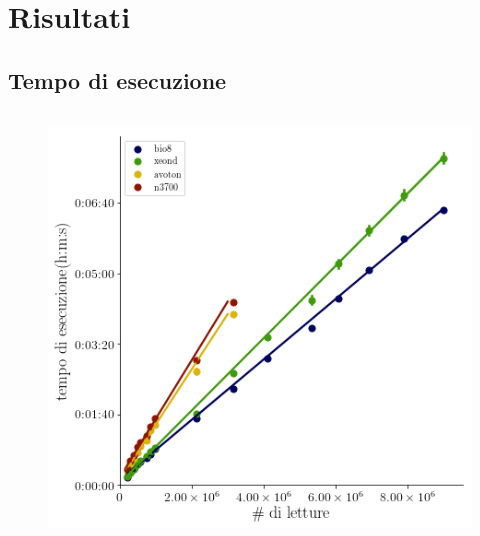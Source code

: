 \documentclass{beamer}
\begin{document}
\section{Risultati}
\subsection{Tempo di esecuzione}

\begin{frame}
\begin{columns}
\begin{column}{0.8\linewidth}	
\begin{figure}[H]
\centering
\includegraphics[scale=0.5]{sort_picard.png}
\label{subfig:SP}
\end{figure}
\end{column}
\end{columns}
\end{frame}
\end{document}
